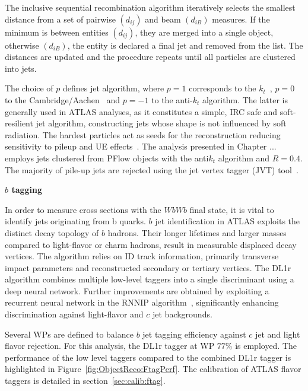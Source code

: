 The inclusive sequential recombination algorithm iteratively selects the smallest distance from a set of pairwise $(d_{ij})$ and beam $(d_{iB})$ measures. If the minimum is between entities $(d_{ij})$, they are merged into a single object, 
otherwise $(d_{iB})$, the entity is declared a final jet and removed from the list.
The distances are updated and the procedure repeats until all particles are clustered into jets.

The choice of $p$ defines jet algorithm, where $p=1$ corresponds to the $k_t$~\cite{Ellis_1993}, $p=0$ to the Cambridge/Aachen~\cite{Dokshitzer_1997} and $p = -1$ to the anti-$k_t$ algorithm.
The latter is generally used in ATLAS analyses, as it 
constitutes a simple, IRC safe and soft-resilient jet algorithm, constructing
jets whose shape is not influenced by soft radiation.
The hardest particles act as seeds for the reconstruction reducing sensitivity to pileup and UE effects~\cite{Cacciari:2008gp}.
The analysis presented in Chapter ... employs jets clustered from PFlow objects with the anti$k_t$ algorithm and $R=0.4$. %
The majority of pile-up jets are rejected using the jet vertex tagger (JVT) tool~\cite{ATLAS-CONF-2014-018}.

\vspace{.5cm}
\noindent
\textbf{$b$ tagging}
\vspace{.5cm}

\noindent
In order to measure cross sections with the $WbWb$ final state, it is vital to identify jets originating from b quarks.
$b$ jet identification in ATLAS exploits the distinct decay topology of $b$ hadrons.
Their longer lifetimes and larger masses compared to light-flavor or charm hadrons, result in measurable displaced decay vertices. The algorithm relies on ID track information, primarily transverse impact parameters and reconstructed secondary or tertiary vertices. The DL1r~\cite{FTAG-2019-07} algorithm combines multiple low-level taggers into a single discriminant using a deep neural network. 
Further improvements are obtained by exploiting a recurrent neural network in the RNNIP algorithm~\cite{ATL-PHYS-PUB-2017-003}, significantly enhancing discrimination against light-flavor and $c$ jet backgrounds.

Several WPs are defined to balance $b$ jet tagging efficiency against $c$ jet and light flavor rejection. 
For this analysis, the DL1r tagger at WP $77\%$ is employed.
The performance of the low level taggers compared to the combined DL1r tagger is highlighted in Figure~\ref{fig:ObjectReco:FtagPerf}.
The calibration of ATLAS flavor taggers is detailed in section~\ref{sec:calib:ftag}.

